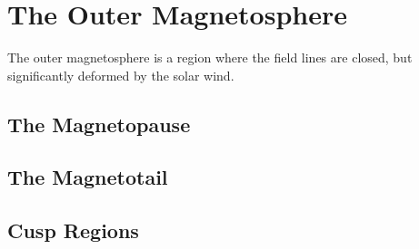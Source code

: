 





\section{The Outer Magnetosphere}

The outer magnetosphere is a region where the field lines are closed, but significantly deformed by the solar wind. 

\subsection{The Magnetopause}

\subsection{The Magnetotail}

\subsection{Cusp Regions}


